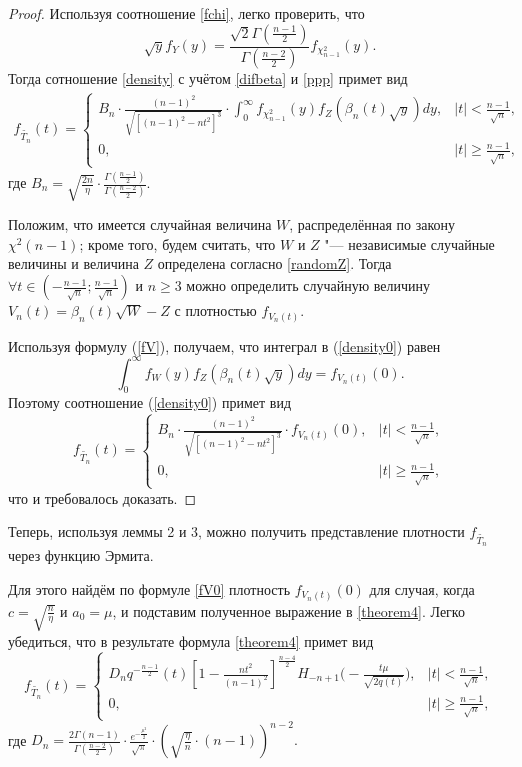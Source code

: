 \begin{proof}
Используя соотношение \eqref{fchi}, легко проверить, что
\begin{equation}\label{ppp}
\sqrt{y}f_Y(y)=\frac{\sqrt{2}\Gamma\left(\frac{n-1}{2}\right)}{\Gamma\left(\frac{n-2}{2}\right)}f_{\chi^2_{n-1}}(y).
\end{equation}
Тогда  сотношение \eqref{density} с учётом \eqref{difbeta} и \eqref{ppp} примет вид
\begin{eqnarray}\label{density0}
f_{\tilde{T_n}}(t)=
\left\{
\begin{array}{cr}
B_n\cdot
\frac{(n-1)^2}
{\sqrt{[(n-1)^2-nt^2]^3}}\cdot \displaystyle
\int_0^{\infty}f_{\chi^2_{n-1}}(y)f_Z(\beta_n(t)\sqrt{y})dy,& |t|<\frac{n-1}{\sqrt{n}},\\
0,& |t|\ge\frac{n-1}{\sqrt{n}},
\end{array}
\right.
\end{eqnarray}
где $B_n=\sqrt{\frac{2n}{\eta}}\cdot\frac{\Gamma\left(\frac{n-1}{2}\right)}{\Gamma\left(\frac{n-2}{2}\right)}$.

Положим, что имеется случайная величина $W$, распределённая по закону $\chi^2(n-1)$;
кроме того, будем считать, что  $W$ и $Z$ "--- независимые случайные величины
и величина  $Z$ определена согласно \eqref{randomZ}.
Тогда $\forall t \in (-\frac{n-1}{\sqrt{n}}; \frac{n-1}{\sqrt{n}})$ и \mbox{$n \ge 3$} можно определить случайную величину
 $V_n(t)=\beta_n(t)\sqrt{W}-Z$ с плотностью $f_{V_n(t)}$.

Используя формулу (\ref{fV}), получаем, что интеграл в  (\ref{density0}) равен
$$
\int_0^{\infty}f_{W}(y)f_Z(\beta_n(t)\sqrt{y})dy=f_{V_{n}(t)}(0).
$$
Поэтому соотношение (\ref{density0}) примет вид
\[
f_{\tilde{T_n}}(t)=
\left\{
\begin{array}{cr}
B_n\cdot
\frac{(n-1)^2}
{\sqrt{[(n-1)^2-nt^2]^3}}\cdot f_{V_{n}(t)}(0),& |t|<\frac{n-1}{\sqrt{n}},\\
0,& |t|\ge\frac{n-1}{\sqrt{n}},
\end{array}
\right.
\]
что и требовалось доказать. \end{proof}

\smallskip

 Теперь, используя леммы 2 и 3, можно получить  представление плотности $f_{\tilde{T_n}}$ через функцию Эрмита.

Для этого найдём по формуле \eqref{fV0} плотность $f_{V_n(t)}(0)$ для случая, когда $c=\sqrt{\frac{n}{\eta}}$ и
$a_0=\mu$, и подставим полученное выражение в \eqref{theorem4}. Легко убедиться, что в результате формула \eqref{theorem4}
примет вид
\begin{equation}\label{newpredst}
f_{\tilde{T_n}}(t)=
\left\{
    \begin{array}{cr}
    D_nq^{-\frac{n-1}{2}}(t)
\left[1-\frac{nt^2}{(n-1)^2}\right]^{\frac{n-4}{2}}
H_{-n+1}\bigl(-\frac{t\mu}{\sqrt{2q(t)}}\bigr),& |t|<\frac{n-1}{\sqrt{n}},\\
     0 , &|t|\ge\frac{n-1}{\sqrt{n}},
    \end{array}
\right.
\end{equation}
где
$
D_n=\frac{2\Gamma\left(n-1\right)}{\Gamma\left(\frac{n-2}{2}\right)}
\cdot \frac{e^{-\frac{\mu^2}{2}}}{\sqrt{\pi}}
\cdot\left(\sqrt{\frac{\eta}{n}}\cdot(n-1)\right)^{n-2}.
$

